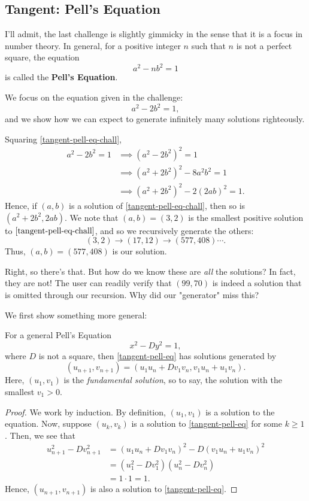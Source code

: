 \documentclass[../jarvis.tex]{subfiles}
\begin{document}
\subsection{Tangent: Pell's Equation}
I'll admit, the last challenge is slightly gimmicky in the sense that it is a focus in number theory. In general, for a positive integer $n$ such that $n$ is not a perfect square,
the equation $$a^2-nb^2=1$$
is called the \textbf{Pell's Equation}.

We focus on the equation given in the challenge:
\begin{equation}\label{tangent-pell-eq-chall}
    a^2-2b^2=1,
\end{equation} and we show how we can expect to generate infinitely many solutions righteously.

Squaring \eqref{tangent-pell-eq-chall},
\begin{align*}
    a^2-2b^2=1&\implies (a^2-2b^2)^2=1 \\
    &\implies (a^2+2b^2)^2-8a^2b^2=1\\
    &\implies (a^2+2b^2)^2-2(2ab)^2=1.
\end{align*}
Hence, if $(a,b)$ is a solution of \eqref{tangent-pell-eq-chall}, then so is $(a^2+2b^2,2ab)$. We note that $(a,b)=(3,2)$ is the smallest positive solution to $\eqref{tangent-pell-eq-chall}$, and so we recursively generate the others:
$$(3,2)\rightarrow (17,12)\rightarrow (577,408)\cdots.$$
Thus, $(a,b)=(577,408)$ is our solution.

Right, so there's that. But how do we know these are \textit{all} the solutions? In fact, they are not! The user can readily verify that $(99,70)$ is indeed a solution that is omitted through our recursion. Why did our "generator" miss this?

We first show something more general:
\begin{lemma}
    For a general Pell's Equation
    \begin{equation}\label{tangent-pell-eq}
        x^2-Dy^2=1,
    \end{equation}
    where $D$ is not a square, then \eqref{tangent-pell-eq} has solutions generated by 
    \begin{equation}\label{tangent-pell-soln}
        (u_{n+1},v_{n+1})=(u_1u_n+Dv_1v_n, v_1u_n+u_1v_n).
    \end{equation}
    Here, $(u_1,v_1)$ is the \textit{fundamental solution}, so to say, the solution with the smallest $v_1>0$.
\end{lemma}
\begin{proof}
    We work by induction. By definition, $(u_1,v_1)$ is a solution to the equation. Now, suppose $(u_k,v_k)$ is a solution to \eqref{tangent-pell-eq} for some $k\geq 1$. Then, we see that
    \begin{align*}
        u_{n+1}^2-Dv_{n+1}^2&=(u_1u_n+Dv_1v_n)^2-D(v_1u_n+u_1v_n)^2 \\
        &=(u_1^2-Dv_1^2)(u_n^2-Dv_n^2) \\
        &=1\cdot1=1.
    \end{align*}
    Hence, $(u_{n+1},v_{n+1})$ is also a solution to \eqref{tangent-pell-eq}.
\end{proof}
\end{document}
